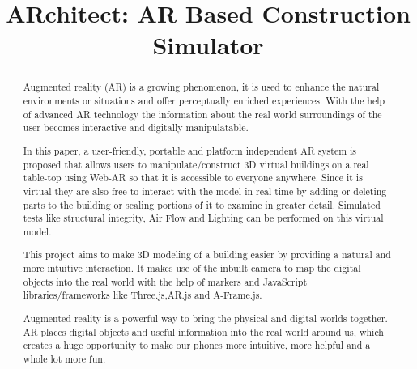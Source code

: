 \documentclass[conference]{IEEEtran}
\begin{document}
\title{ARchitect: AR Based Construction Simulator}

\author{
\and
{}
\and
{}
\and
{}
}

\maketitle


\begin{abstract}
	Augmented reality (AR) is a growing phenomenon, it is used to enhance the natural environments 
	or situations and offer perceptually enriched experiences.
	With the help of advanced AR technology the information about the real world surroundings of the user becomes interactive and digitally manipulatable.
	
	In this paper, a user-friendly, portable and platform independent AR system 
	is proposed that allows users to manipulate/construct 3D virtual buildings on a real table-top using Web-AR so that it is accessible to everyone anywhere. Since it is virtual they are also free to interact with the model in real time by adding or deleting parts to the building or scaling portions of it to examine in greater detail. Simulated tests like structural integrity, Air Flow and Lighting can be performed on this virtual model. 
	
	This project aims to make 3D modeling of a building easier by providing a
	natural and more intuitive interaction. It makes use of the inbuilt camera
	to map the digital objects into the real world with the help of markers and
	JavaScript libraries/frameworks like Three.js,AR.js and A-Frame.js.
	
	Augmented reality is a powerful way to bring the physical and digital worlds together. AR places digital objects and useful information into the real world around us, which creates a huge opportunity to make our phones more intuitive, more helpful and a whole lot more fun.
\end{abstract}
\end{document}
